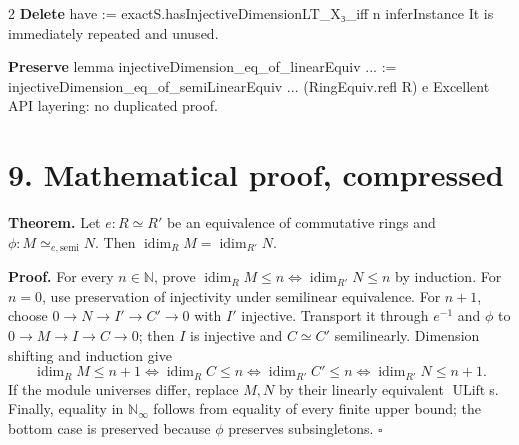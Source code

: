 \documentclass[10pt]{article}
\newenvironment{lean}{\Verbatim[fontsize=\scriptsize,frame=single,framesep=1.5mm,rulecolor=\color{blue},formatcom=\leanfont]}{\endVerbatim}
\newcommand{\injdim}{\operatorname{idim}}
\begin{document}
\begin{multicols}{2}
\textbf{Delete}
\begin{lean}
have := exactS.hasInjectiveDimensionLT_X₃_iff
  n inferInstance
\end{lean}
It is immediately repeated and unused.

\columnbreak
\textbf{Preserve}
\begin{lean}
lemma injectiveDimension_eq_of_linearEquiv ... :=
  injectiveDimension_eq_of_semiLinearEquiv
    ... (RingEquiv.refl R) e
\end{lean}
Excellent API layering: no duplicated proof.
\end{multicols}

\section*{9. Mathematical proof, compressed}

\textbf{Theorem.}
Let $e:R\simeq R'$ be an equivalence of commutative rings and
$\phi:M\simeq_{e,\mathrm{semi}}N$.  Then
$\injdim_R M=\injdim_{R'}N$.

\textbf{Proof.}
For every $n\in\mathbb N$, prove
$\injdim_RM\le n\iff\injdim_{R'}N\le n$ by induction.
For $n=0$, use preservation of injectivity under semilinear equivalence.
For $n+1$, choose $0\to N\to I'\to C'\to0$ with $I'$ injective.
Transport it through $e^{-1}$ and $\phi$ to
$0\to M\to I\to C\to0$; then $I$ is injective and $C\simeq C'$ semilinearly.
Dimension shifting and induction give
\[
\injdim_RM\le n+1
\iff\injdim_RC\le n
\iff\injdim_{R'}C'\le n
\iff\injdim_{R'}N\le n+1.
\]
If the module universes differ, replace $M,N$ by their linearly equivalent $\operatorname{ULift}$s.
Finally, equality in $\mathbb N_\infty$ follows from equality of every finite upper bound; the bottom
case is preserved because $\phi$ preserves subsingletons. \hfill$\square$

\vfill
\begin{center}
\end{center}
\end{document}
